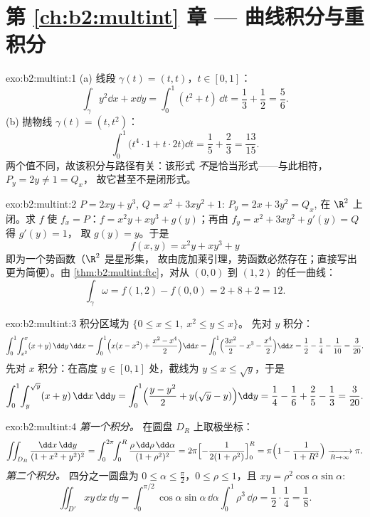 \section*{第 \ref{ch:b2:multint} 章 --- 曲线积分与重积分}

\begin{solution}{exo:b2:multint:1}
(a) 线段 $\gamma(t) = (t, t)$，$t \in [0,1]$：
\[
\int_\gamma y^2\dd x + x\dd y
= \int_0^1 (t^2 + t)\,\dd t = \frac13 + \frac12 = \frac56 .
\]
(b) 抛物线 $\gamma(t) = (t, t^2)$：
\[
\int_0^1 \bigl(t^4\cdot 1 + t\cdot 2t\bigr)\dd t
= \frac15 + \frac23 = \frac{13}{15} .
\]
两个值不同，故该积分与路径有关：该形式
\emph{不}是恰当形式——与此相符，$P_y = 2y \neq 1 = Q_x$，
故它甚至不是闭形式。
\end{solution}

\begin{solution}{exo:b2:multint:2}
$P = 2xy + y^3$, $Q = x^2 + 3xy^2 + 1$: $P_y = 2x + 3y^2 = Q_x$,
在 $\R^2$ 上闭。求 $f$ 使 $f_x = P$：$f = x^2y + xy^3
+ g(y)$；再由 $f_y = x^2 + 3xy^2 + g'(y) = Q$ 得 $g'(y) = 1$，
取 $g(y) = y$。于是
\[
f(x, y) = x^2y + xy^3 + y
\]
即为一个势函数（$\R^2$ 是星形集，
故由庞加莱引理，势函数必然存在；直接写出更为简便）。由
\cref{thm:b2:multint:ftc}，对从 $(0,0)$ 到 $(1,2)$ 的任一曲线：
\[
\int_\gamma\omega = f(1, 2) - f(0, 0) = 2 + 8 + 2 = 12 .
\]
\end{solution}

\begin{solution}{exo:b2:multint:3}
积分区域为 $\{0 \leq x \leq 1,\ x^2 \leq y \leq x\}$。
先对 $y$ 积分：
\[
\int_0^1\!\int_{x^2}^{x}(x + y)\,\dd y\,\dd x
= \int_0^1\Bigl(x(x - x^2)
+ \frac{x^2 - x^4}{2}\Bigr)\dd x
= \int_0^1\Bigl(\frac{3x^2}{2} - x^3 - \frac{x^4}{2}\Bigr)\dd x
= \frac12 - \frac14 - \frac1{10} = \frac{3}{20} .
\]
先对 $x$ 积分：在高度 $y \in [0, 1]$ 处，截线为 $y \leq x \leq
\sqrt y$，于是
\[
\int_0^1\!\int_{y}^{\sqrt y}(x + y)\,\dd x\,\dd y
= \int_0^1\Bigl(\frac{y - y^2}{2}
+ y(\sqrt y - y)\Bigr)\dd y
= \frac14 - \frac16 + \frac25 - \frac13 = \frac{3}{20} .
\]
\end{solution}

\begin{solution}{exo:b2:multint:4}
\emph{第一个积分。} 在圆盘 $D_R$ 上取极坐标：
\[
\iint_{D_R}\frac{\dd x\,\dd y}{(1 + x^2 + y^2)^2}
= \int_0^{2\pi}\!\!\int_0^R
\frac{\rho\,\dd\rho\,\dd\alpha}{(1 + \rho^2)^2}
= 2\pi\Bigl[-\frac{1}{2(1 + \rho^2)}\Bigr]_0^R
= \pi\Bigl(1 - \frac{1}{1 + R^2}\Bigr)
\xrightarrow[R \to \infty]{} \pi .
\]
\emph{第二个积分。} 四分之一圆盘为 $0 \leq \alpha \leq
\frac\pi2$，$0 \leq \rho \leq 1$，且 $xy =
\rho^2\cos\alpha\sin\alpha$:
\[
\iint_{D'}xy\,\dd x\,\dd y
= \int_0^{\pi/2}\!\!\cos\alpha\sin\alpha\,\dd\alpha
\int_0^1 \rho^3\,\dd\rho
= \frac12\cdot\frac14 = \frac18 .
\]
\end{solution}

